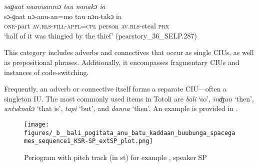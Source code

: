 \ea
\label{ex:a sagaat naanuanmo}


{
	\ex
	\label{ex:sagaat naanuanmo tau nanako ia}
	\textit{saɡaat naanuanmɔ tau nanakɔ ia} \\
	\gll   sɔ-ɡaat nɔ-anu-an=mo tau nɔn-takɔ ia \\
	\textsc{one}-part \textsc{av.rls-}\textsc{fill}\textsc{-appl=cpl} person \textsc{av.rls-}steal \textsc{prx} \\
	\glt `half of it was thingied by the thief'
	\hfill(pearstory\_36\_SELP.287)
}
\z
\z	









This category includes adverbs and connectives that occur as single CIUs, as well as prepositional phrases. Additionally, it encompasses fragmentary CIUs and instances of code-switching.

Frequently, an adverb or connective itself forms a separate CIU---often a singleton IU. The most commonly used items in Totoli are \textit{bali} `so', \textit{inʤan} `then', \textit{antuknakɔ} `that is', \textit{tapi} `but', and \textit{danna} `then'. An example is provided in .


\begin{figure}
	\texttt{[image: figures/\_b\_\_bali\_pogitata\_anu\_batu\_kaddaan\_buubunga\_spacegames\_sequence1\_KSR-SP\_extSP\_plot.png]}
	\caption{Periogram with pitch track (in st) for example , speaker SP}
	\label{pitch:bali pogitata anu batu bunga}
\end{figure}



\ea
\label{ex:bali pogitata anu batu bunga}

